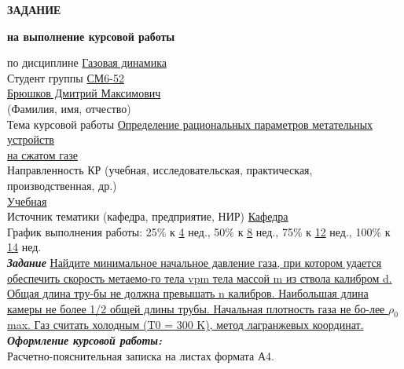 \documentclass[14pt, a4paper]{extarticle} %
\newcommand{\und}[1]{\uline{#1}}
\begin{document}
\begin{titlepage}
    \vspace{2cm}
    \textbf{ЗАДАНИЕ}

    \textbf{на выполнение курсовой работы}

    \vspace{1cm}
    \begin{flushleft}
        по дисциплине \und{Газовая динамика} \hfill \underline{\hspace{7cm}} \\[0.5cm]
        Студент группы \und{СМ6-52} \\[0.5cm]
        \underline{\hspace{12cm}} \und{Брюшков Дмитрий Максимович} \\
        \hspace{5cm} (Фамилия, имя, отчество) \\[0.5cm]
        Тема курсовой работы \und{Определение рациональных параметров метательных устройств} \\
        \und{на сжатом газе} \\[0.5cm]
        Направленность КР (учебная, исследовательская, практическая, производственная, др.) \\
        \und{Учебная} \hfill \underline{\hspace{7cm}} \\[0.5cm]
        Источник тематики (кафедра, предприятие, НИР) \und{Кафедра} \hfill \underline{\hspace{5cm}} \\[0.5cm]
        График выполнения работы: 25\% к \und{4} нед., 50\% к \und{8} нед., 75\% к \und{12} нед., 100\% к \und{14} нед. \\[1cm]
        \textbf{\textit{Задание}} \und{Найдите минимальное начальное давление газа, при котором удается обеспечить скорость метаемо-го тела vpm тела массой m из ствола калибром d. Общая длина тру-бы не должна превышать n калибров. Наибольшая длина камеры не более 1/2 общей длины трубы. Начальная плотность газа не бо-лее $\rho_0$ max. Газ считать холодным (T0 = 300 K), метод лагранжевых координат.} \\[1cm]
        \textbf{\textit{Оформление курсовой работы:}} \\[0.5cm]
        Расчетно-пояснительная записка на \underline{\hspace{2cm}} листах формата А4. \\[0.5cm]
        \underline{\hspace{15cm}} \\
        \underline{\hspace{15cm}} \\

\end{flushleft}
\end{titlepage}
\end{document}
